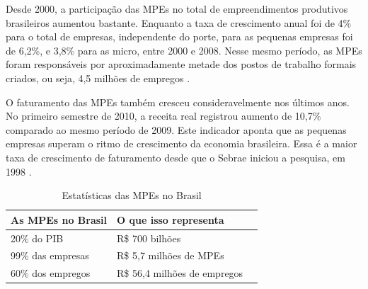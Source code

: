 Desde 2000, a participação das MPEs no total de empreendimentos produtivos brasileiros aumentou bastante. Enquanto a taxa de crescimento anual foi de 4\% para o total de empresas, independente do porte, para as pequenas empresas foi de 6,2\%, e 3,8\% para as micro, entre 2000 e 2008. Nesse mesmo período, as MPEs foram responsáveis por aproximadamente metade dos postos de trabalho formais criados, ou seja, 4,5 milhões de empregos \cite{PORTALBRASIL}.

O faturamento das MPEs também cresceu consideravelmente nos últimos anos. No primeiro semestre de 2010, a receita real registrou aumento de 10,7\% comparado ao mesmo período de 2009. Este indicador aponta que as pequenas empresas superam o ritmo de crescimento da economia brasileira. Essa é a maior taxa de crescimento de faturamento desde que o Sebrae iniciou a pesquisa, em 1998 \cite{PORTALBRASIL}.

\begin{table}[!htpb]
 \centering
    \begin{tabular}{|l|p{5cm}|c|} 
    \hline
        \textbf{As MPEs no Brasil} & \textbf{O que isso representa} \\
    \hline
        20\% do PIB & R\$ 700 bilhões \\
    \hline
        99\% das empresas & R\$ 5,7 milhões de MPEs \\
    \hline
        60\% dos empregos & R\$ 56,4 milhões de empregos \\
    \hline
    \end{tabular}
    \caption{Estatísticas das MPEs no Brasil}
    \label{t_fixa}
\end{table}